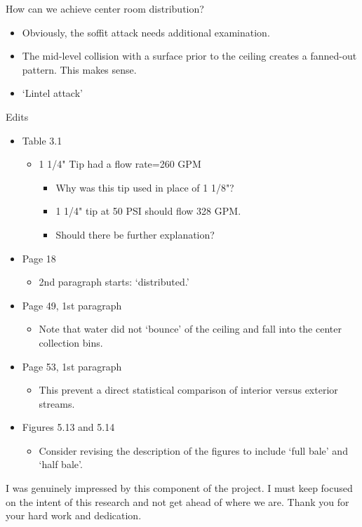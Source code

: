 \documentclass[12pt,oneside]{book}
\begin{document}
\begin{appendix}
How can we achieve center room distribution?
\begin{itemize}
	\item Obviously, the soffit attack needs additional examination.
	\item The mid-level collision with a surface prior to the ceiling creates a fanned-out pattern. This makes sense.
	\item `Lintel attack'
\end{itemize}
 
Edits
\begin{itemize}
\item Table 3.1
	\begin{itemize}
	\item 1 1/4" Tip had a flow rate=260 GPM
		\begin{itemize}
			\item Why was this tip used in place of 1 1/8"?
			\item 1 1/4" tip at 50 PSI should flow 328 GPM.
			\item Should there be further explanation?
		\end{itemize}
	\end{itemize}
\item  Page 18
	\begin{itemize}
		\item 2nd paragraph starts: `distributed.'
	\end{itemize}
\item Page 49, 1st paragraph
	\begin{itemize}
		\item Note that water did not `bounce' of the ceiling and fall into the center collection bins.
	\end{itemize}
\item Page 53, 1st paragraph
	\begin{itemize}
		\item This prevent a direct statistical comparison of interior versus exterior streams.
	\end{itemize}
\item Figures 5.13 and 5.14
	\begin{itemize}
		\item Consider revising the description of the figures to include `full bale' and `half bale'.
	\end{itemize}
\end{itemize}
 
I was genuinely impressed by this component of the project. I must keep focused on the intent of this research and not get ahead of where we are. Thank you for your hard work and dedication.
 

\end{appendix}
\end{document}
